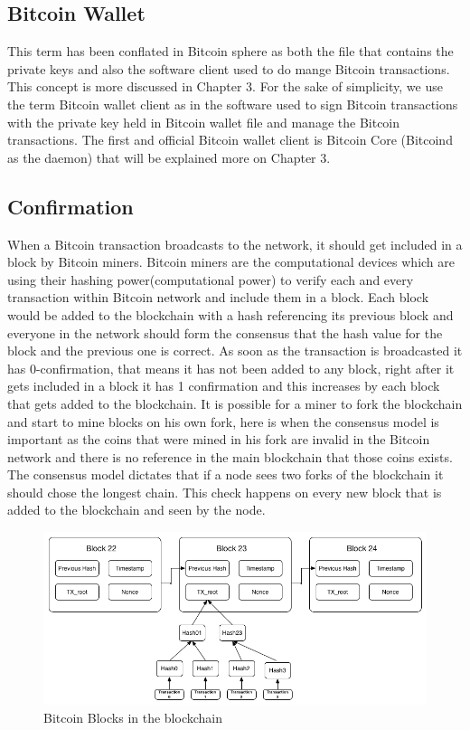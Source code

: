 \subsection{Bitcoin Wallet}
This term has been conflated in Bitcoin sphere as both the file that contains the private keys and also the software client used to do mange Bitcoin transactions. This concept is more discussed in Chapter 3. For the sake of simplicity, we use the term Bitcoin wallet client as in the software used to sign Bitcoin transactions with the private key held in Bitcoin wallet file and manage the Bitcoin transactions.
The first and official Bitcoin wallet client is Bitcoin Core (Bitcoind as the daemon) that will be explained more on Chapter 3.


\subsection{Confirmation}
When a Bitcoin transaction broadcasts to the network, it should get included in a block by Bitcoin miners. Bitcoin miners are the computational devices which are using their hashing power(computational power) to verify each and every transaction within Bitcoin network and include them in a block. Each block would be added to the blockchain with a hash referencing its previous block and everyone in the network should form the consensus that the hash value for the block and the previous one is correct. As soon as the transaction is broadcasted it has 0-confirmation, that means it has not been added to any block, right after it gets included in a block it has 1 confirmation and this increases by each block that gets added to the blockchain.
It is possible for a miner to fork the blockchain and start to mine blocks on his own fork, here is when the consensus model is important as the coins that were mined in his fork are invalid in the Bitcoin network and there is no reference in the main blockchain that those coins exists. The consensus model dictates that if a node sees two forks of the blockchain it should chose the longest chain. This check happens on every new block that is added to the blockchain and seen by the node.

\begin{figure}
\centering
\includegraphics[width=\linewidth]{fig/bitcoinblocks.png}
  \caption{Bitcoin Blocks in the blockchain ~\cite{Nak08}}
\label{fig:bitcoinblocks}
\end{figure}

